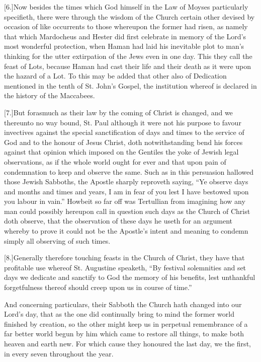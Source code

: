 [6.]Now besides the times which God himself in the Law of Moyses particularly specifieth, there were through the wisdom of the Church certain other devised by occasion of like occurrents to those whereupon the former had risen, as namely that which Mardocheus and Hester did first celebrate in memory of the Lord’s most wonderful protection, when Haman had laid his inevitable plot to man’s thinking for the utter extirpation of the Jews even in one day. This they  call the feast of Lots, because Haman had cast their life and their death as it were upon the hazard of a Lot.
 To this may be added that other also of Dedication mentioned in the tenth of St. John’s Gospel, the institution whereof is declared in the history of the Maccabees.

[7.]But forasmuch as their law by the coming of Christ is changed, and we thereunto no way bound, St. Paul although it were not his purpose to favour invectives against the special sanctification of days and times to the service of God and to the honour of Jesus Christ, doth notwithstanding bend his forces against that opinion which imposed on the Gentiles the yoke of Jewish legal observations, as if the whole world ought for ever and that upon pain of condemnation to keep and observe the same. Such as in this persuasion hallowed those Jewish Sabboths, the Apostle sharply reproveth saying, “Ye observe days and months and times and years, I am in fear of you lest I have bestowed upon you labour in vain.” Howbeit so far off was Tertullian from imagining how any man could possibly hereupon call in question such days as the Church of Christ doth observe, that the observation of these days he useth for an argument whereby to prove it could not be the Apostle’s intent and meaning to condemn simply all observing of such times.

[8.]Generally therefore touching feasts in the Church of Christ, they have that profitable use whereof St. Augustine speaketh, “By festival solemnities and set days we dedicate and sanctify to God the memory of his benefits, lest unthankful forgetfulness thereof should creep upon us in course of time.”

And concerning particulars, their Sabboth the Church hath changed into our Lord’s day, that as the one did continually bring to mind the former world finished by creation, so the  other might keep us in perpetual remembrance of a far better world begun by him which came to restore all things,
 to make both heaven and earth new. For which cause they honoured the last day, we the first, in every seven throughout the year.

